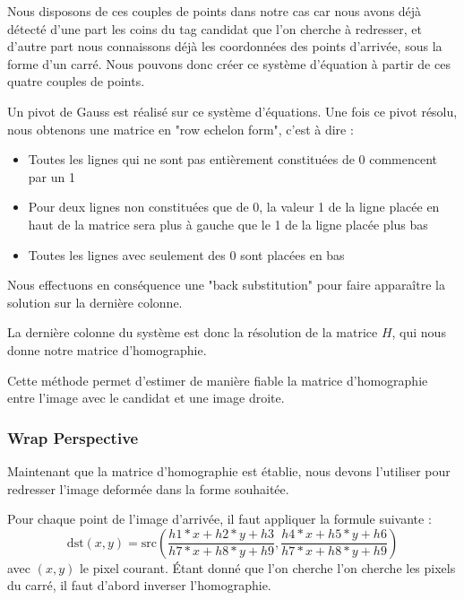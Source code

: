         Nous disposons de ces couples de points dans notre cas car nous avons déjà détecté d'une part les coins du tag candidat que l'on cherche à redresser, et d'autre part nous connaissons déjà les coordonnées des points d'arrivée, sous la forme d'un carré. Nous pouvons donc créer ce système d'équation à partir de ces quatre couples de points.

        Un pivot de Gauss est réalisé sur ce système d'équations. Une fois ce pivot résolu, nous obtenons une matrice en "row echelon form", c'est à dire :
    
        \begin{itemize}
            \item Toutes les lignes qui ne sont pas entièrement constituées de 0 commencent par un 1
            \item Pour deux lignes non constituées que de 0, la valeur 1 de la ligne placée en haut de la matrice sera plus à gauche que le 1 de la ligne placée plus bas
            \item Toutes les lignes avec seulement des 0 sont placées en bas
        \end{itemize}
    
        Nous effectuons en conséquence une "back substitution" pour faire apparaître la solution sur la dernière colonne.
    
        La dernière colonne du système est donc la résolution de la matrice $H$, qui nous donne notre matrice d'homographie.

        Cette méthode permet d'estimer de manière fiable la matrice d'homographie entre l'image avec le candidat et une image droite.

        
            \subsubsection{Wrap Perspective}

            Maintenant que la matrice d'homographie est établie, nous devons l'utiliser pour redresser l'image deformée dans la forme souhaitée.

            Pour chaque point de l'image d'arrivée, il faut appliquer la formule suivante :
            \begin{equation*}
                \text{dst}\left(x,y\right) = \text{src}\left(\frac{h1*x + h2*y + h3}{h7*x + h8*y + h9}, \frac{h4*x + h5*y + h6}{h7*x + h8*y + h9}\right)
            \end{equation*}
            avec $(x, y)$ le pixel courant. Étant donné que l'on cherche l'on cherche les pixels du carré, il faut d'abord inverser l'homographie.

